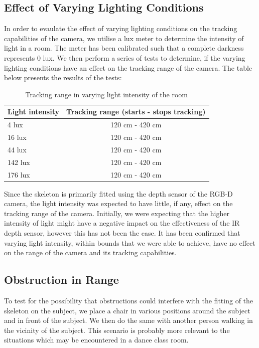 \documentclass[a4paper]{article}
\begin{document}
\subsection{Effect of Varying Lighting Conditions}
\noindent
In order to evaulate the effect of varying lighting conditions on the tracking capabilities of the camera, we utilise a lux meter to determine the intensity of light in a room. The meter has been calibrated such that a complete darkness represents 0 lux. We then perform a series of tests to determine, if the varying lighting conditions have an effect on the tracking range of the camera. The table below presents the results of the tests:
\begin{table}[h]
\center
\begin{tabular}{ | l | c |}
\hline
Light intensity & Tracking range (starts - stops tracking) \\
\hline
4 lux & 120 cm - 420 cm\\
16 lux & 120 cm - 420 cm\\
44 lux & 120 cm - 420 cm\\
142 lux & 120 cm - 420 cm\\
176 lux & 120 cm - 420 cm\\
\hline
\end{tabular}
\caption{Tracking range in varying light intensity of the room}
\label{cam_range_varying_light}
\end{table}

\noindent
Since the skeleton is primarily fitted using the depth sensor of the RGB-D camera, the light intensity was expected to have little, if any, effect on the tracking range of the camera. Initially, we were expecting that the higher intensity of light might have a negative impact on the effectiveness of the IR depth sensor, however this has not been the case. It has been confirmed that varying light intensity, within bounds that we were able to achieve, have no effect on the range of the camera and its tracking capabilities.

\subsection{Obstruction in Range}
\noindent
To test for the possibility that obstructions could interfere with the fitting of the skeleton on the subject, we place a chair in various positions around the subject and in front of the subject. We then do the same with another person walking in the vicinity of the subject. This scenario is probably more relevant to the situations which may be encountered in a dance class room.  
\end{document}
